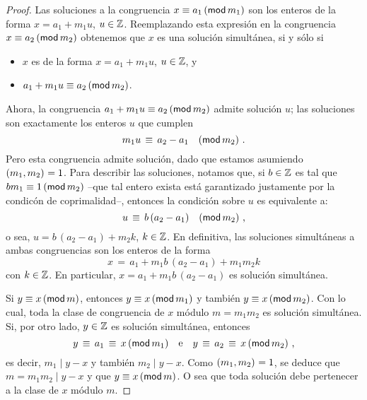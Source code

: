 \begin{proof}
	Las soluciones a la congruencia $x\equiv a_1\tmodulo[m_1]$
	son los enteros de la forma $x=a_1+m_1u$, $u\in\Enteros$.
	Reemplazando esta expresi\'on en la congruencia
	$x\equiv a_2\tmodulo[m_2]$ obtenemos que $x$ es una soluci\'on
	simult\'anea, si y s\'olo si
	\begin{itemize}
		\item $x$ es de la forma $x=a_1+m_1u$, $u\in\Enteros$, y
		\item $a_1+m_1u\equiv a_2\tmodulo[m_2]$.
	\end{itemize}
	Ahora, la congruencia $a_1+m_1u\equiv a_2\tmodulo[m_2]$ admite
	soluci\'on $u$; las soluciones son exactamente los enteros $u$
	que cumplen
	\begin{displaymath}
		m_1u\,\equiv\,a_2-a_1\modulo[m_2]
		\dispstop
	\end{displaymath}
	Pero esta congruencia admite soluci\'on, dado que estamos
	asumiendo $\mcd{m_1,m_2}=1$. Para describir las soluciones,
	notamos que, si $b\in\Enteros$ es tal que
	$bm_1\equiv 1\tmodulo[m_2]$ --que tal entero exista est\'a
	garantizado justamente por la condic\'on de coprimalidad--,
	entonces la condici\'on sobre $u$ es equivalente a:
	\begin{displaymath}
		u\,\equiv\,b\,(a_2-a_1)\modulo[m_2]
		\dispcomma
	\end{displaymath}
	o sea, $u=b\,(a_2-a_1)+m_2k$, $k\in\Enteros$.
	En definitiva, las soluciones simult\'aneas a ambas congruencias
	son los enteros de la forma
	\begin{displaymath}
		x\,=\,a_1+m_1b\,(a_2-a_1)+m_1m_2k
	\end{displaymath}
	con $k\in\Enteros$. En particular, $x=a_1+m_1b\,(a_2-a_1)$ es
	soluci\'on simult\'anea.

	Si $y\equiv x\tmodulo[m]$, entonces $y\equiv x\tmodulo[m_1]$ y
	tambi\'en $y\equiv x\tmodulo[m_2]$. Con lo cual, toda
	la clase de congruencia de $x$ m\'odulo $m=m_1m_2$ es soluci\'on
	simult\'anea. Si, por otro lado, $y\in\Enteros$ es soluci\'on
	simult\'anea, entonces
	\begin{displaymath}
		y\,\equiv\,a_1\,\equiv\, x\tmodulo[m_1]
		\quad\text{e}\quad
		y\,\equiv\,a_2\,\equiv\, x\tmodulo[m_2]
		\dispcomma
	\end{displaymath}
	es decir, $m_1\mid y-x$ y tambi\'en $m_2\mid y-x$. Como
	$\mcd{m_1,m_2}=1$, se deduce que $m=m_1m_2\mid y-x$ y que
	$y\equiv x\tmodulo[m]$. O sea que toda soluci\'on debe pertenecer
	a la clase de $x$ m\'odulo $m$.
\end{proof}


